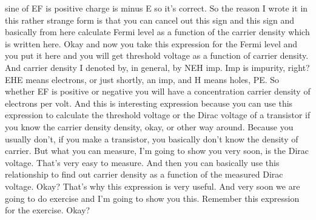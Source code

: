 sine of EF is positive charge is minus E so it's correct. So the reason I wrote it in this rather strange form is that you can cancel out this sign and this sign and basically from here calculate Fermi level as a function of the carrier density which is written here. Okay and now you take this expression for the Fermi level and you put it here and you will get threshold voltage as a function of carrier density. And carrier density I denoted by, in general, by NEH imp. Imp is impurity, right? EHE means electrons, or just shortly, an imp, and H means holes, PE. So whether EF is positive or negative you will have a concentration carrier density of electrons per volt. And this is interesting expression because you can use this expression to calculate the threshold voltage or the Dirac voltage of a transistor if you know the carrier density density, okay, or other way around. Because you usually don't, if you make a transistor, you basically don't know the density of carrier. But what you can measure, I'm going to show you very soon, is the Dirac voltage. That's very easy to measure. And then you can basically use this relationship to find out carrier density as a function of the measured Dirac voltage. Okay? That's why this expression is very useful. And very soon we are going to do exercise and I'm going to show you this. Remember this expression for the exercise. Okay?
